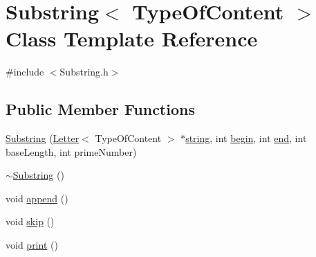 \hypertarget{classSubstring}{\section{Substring$<$ Type\+Of\+Content $>$ Class Template Reference}
\label{classSubstring}
}


{\ttfamily \#include $<$Substring.\+h$>$}

\subsection*{Public Member Functions}
\begin{DoxyCompactItemize}
\item 
\hyperlink{classSubstring_a065a95aaacde32e5b623f0a52d3ca180}{Substring} (\hyperlink{classLetter}{Letter}$<$ Type\+Of\+Content $>$ $\ast$\hyperlink{Main_8cpp_a4505c08c065b48840a30eedd9845cce2}{string}, int \hyperlink{classSubstring_a88e2864cc7847c7f57815de891246cfe}{begin}, int \hyperlink{classSubstring_a5a223bd1f3483d1ee55f4b3997a48862}{end}, int base\+Length, int prime\+Number)
\item 
\hyperlink{classSubstring_ac486fd7645e645efd9c5a07b5e664b20}{$\sim$\+Substring} ()
\item 
void \hyperlink{classSubstring_ae5eb3f9712352741b8bf65b2b231356c}{append} ()
\item 
void \hyperlink{classSubstring_a618432b07f7469537bd8de5c9dccc02f}{skip} ()
\item 
void \hyperlink{classSubstring_a217db9ee47a8cc5db31a671606e039b5}{print} ()
\end{DoxyCompactItemize}
